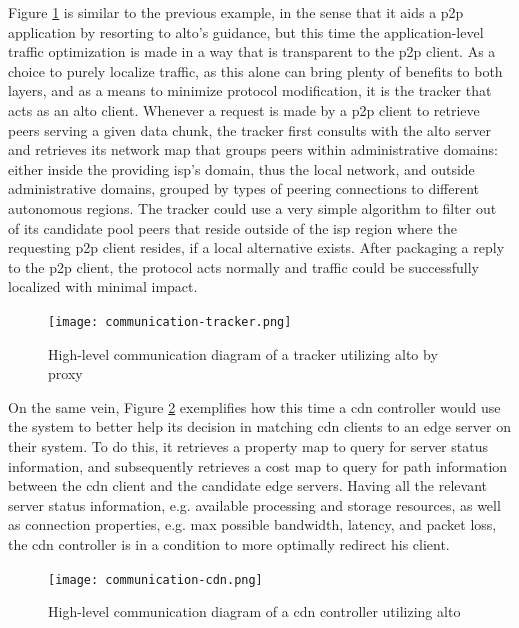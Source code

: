     Figure \ref{fig:communication-tracker} is similar to the previous example, in the sense that it aids a \gls{p2p} application by resorting to \gls{alto}'s guidance, but this time the application-level traffic optimization is made in a way that is transparent to the \gls{p2p} client.
    As a choice to purely localize traffic, as this alone can bring plenty of benefits to both layers, and as a means to minimize protocol modification, it is the tracker that acts as an \gls{alto} client.
    Whenever a request is made by a \gls{p2p} client to retrieve peers serving a given data chunk, the tracker first consults with the \gls{alto} server and retrieves its network map that groups peers within administrative domains: either inside the providing \gls{isp}'s domain, thus the local network, and outside administrative domains, grouped by types of peering connections to different autonomous regions.
    The tracker could use a very simple algorithm to filter out of its candidate pool peers that reside outside of the \gls{isp} region where the requesting \gls{p2p} client resides, if a local alternative exists.
    After packaging a reply to the \gls{p2p} client, the protocol acts normally and traffic could be successfully localized with minimal impact.

\begin{figure}[H]
        \centering
        \hspace*{-1em}
        \texttt{[image: communication-tracker.png]}
        \caption{High-level communication diagram of a tracker utilizing \gls{alto} by proxy}
        \label{fig:communication-tracker}
\end{figure}

    On the same vein, Figure \ref{fig:communication-cdn} exemplifies how this time a \gls{cdn} controller would use the system to better help its decision in matching \gls{cdn} clients to an edge server on their system.
    To do this, it retrieves a property map to query for server status information, and subsequently retrieves a cost map to query for path information between the \gls{cdn} client and the candidate edge servers.
    Having all the relevant server status information, e.g. available processing and storage resources, as well as connection properties, e.g. max possible bandwidth, latency, and packet loss, the \gls{cdn} controller is in a condition to more optimally redirect his client.

\begin{figure}[H]
        \centering
        \hspace*{-2em}
        \texttt{[image: communication-cdn.png]}
        \caption{High-level communication diagram of a \gls{cdn} controller utilizing \gls{alto}}
        \label{fig:communication-cdn}
\end{figure}

